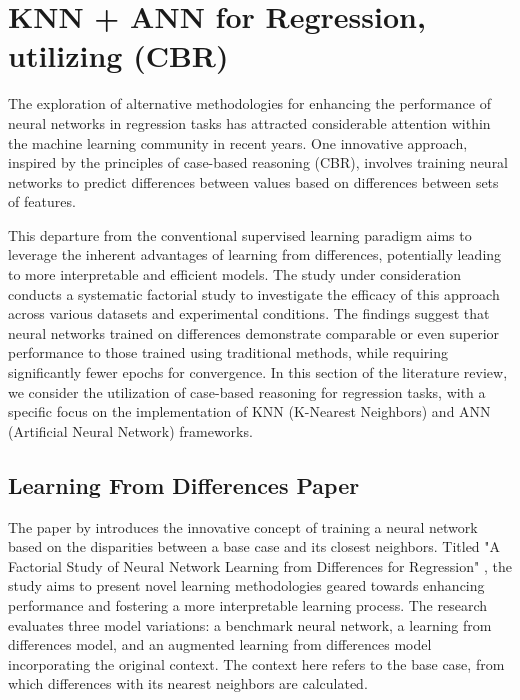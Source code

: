 \documentclass[a4paper, 12pt]{report}
\begin{document}
\section{KNN + ANN for Regression, utilizing (CBR)}

The exploration of alternative methodologies for enhancing the performance of neural networks in regression tasks has attracted considerable attention within the machine
learning community in recent years. One innovative approach, inspired by the principles of case-based reasoning (CBR),
involves training neural networks to predict differences between values based on differences between sets of features.

This departure from the conventional supervised learning paradigm aims to leverage the inherent advantages of learning from differences, potentially
leading to more interpretable and efficient models. The study under consideration \cite{learningFromDifferences2022} conducts a
systematic factorial study to investigate the efficacy of this approach across various datasets and experimental conditions.
The findings suggest that neural networks trained on differences demonstrate comparable or even superior performance to those trained using traditional methods,
while requiring significantly fewer epochs for convergence. In this section of the literature review, we consider the utilization of case-based reasoning for regression tasks,
with a specific focus on the implementation of KNN (K-Nearest Neighbors) and ANN (Artificial Neural Network) frameworks.

\subsection{Learning From Differences Paper}

The paper by \cite{learningFromDifferences2022} introduces the innovative concept of training a neural network based on the disparities between a base case and its closest neighbors.
Titled "A Factorial Study of Neural Network Learning from Differences for Regression" \cite{learningFromDifferences2022},
the study aims to present novel learning methodologies geared towards enhancing performance and fostering a more interpretable learning process.
The research evaluates three model variations: a benchmark neural network, a learning from differences model, and an augmented learning from differences model incorporating the original context.
The context here refers to the base case, from which differences with its nearest neighbors are calculated.
\end{document}
